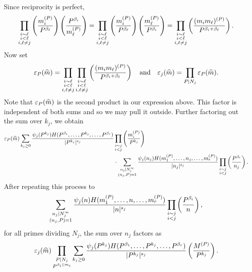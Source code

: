 \documentclass[12pt,reqno,oneside]{amsart}
\begin{document}
    Since reciprocity is perfect,
    \[
        \prod_{\substack{i \sim \ell \\ i < \ell \\ i,\ell \neq j}}\left(\frac{m_{i}^{(P)}}{P^{\beta_{\ell}}}\right)\left(\frac{P^{\beta_{i}}}{m_{\ell}^{(P)}}\right) = \prod_{\substack{i \sim \ell \\ i < \ell \\ i,\ell \neq j}}\left(\frac{m_{i}^{(P)}}{P^{\beta_{\ell}}}\right)\left(\frac{m_{\ell}^{(P)}}{P^{\beta_{i}}}\right) = \prod_{\substack{i \sim \ell \\ i < \ell \\ i,\ell \neq j}}\left(\frac{(m_{i}m_{\ell})^{(P)}}{P^{\beta_{i}+\beta_{\ell}}}\right).
    \]
    Now set
    \[
        \varepsilon_{P}(\widehat{m}) = \prod_{\substack{i \sim \ell \\ i < \ell \\ i,\ell \neq j}}\prod_{\substack{i \sim \ell \\ i < \ell \\ i,\ell \neq j}}\left(\frac{(m_{i}m_{\ell})^{(P)}}{P^{\beta_{i}+\beta_{\ell}}}\right) \quad \text{and} \quad \varepsilon_{j}(\widehat{m}) = \prod_{P \mid N_{j}}\varepsilon_{P}(\widehat{m}).
    \]
    Note that $\varepsilon_{P}(\widehat{m})$ is the second product in our expression above. This factor is independent of both sums and so we may pull it outside. Further factoring out the sum over $k_{j}$, we obtain
    \begin{align*}
        \varepsilon_{P}(\widehat{m})\sum_{k_{j} \ge 0}\frac{\psi_{j}(P^{k_{j}})H(P^{\beta_{1}},\ldots,P^{k_{j}},\ldots,P^{\beta_{r}})}{|P^{k_{j}}|^{s_{j}}}&\prod_{\substack{i \sim j \\ i < j}}\left(\frac{m_{i}^{(P)}}{P^{k_{j}}}\right) \\
        &\cdot \sum_{\substack{n_{j} \mid N_{j}^{\infty} \\ (n_{j},P) = 1}}\frac{\psi_{j}(n_{j})H(m_{1}^{(P)},\ldots,n_{j},\ldots,m_{r}^{(P)})}{|n_{j}|^{s_{j}}}\prod_{\substack{i \sim j \\ i < j}}\left(\frac{P^{\beta_{i}}}{n_{j}}\right).
    \end{align*}
    After repeating this process to
    \[
        \sum_{\substack{n_{j} \mid N_{j}^{\infty} \\ (n_{j},P) = 1}}\frac{\psi_{j}(n)H(m_{1}^{(P)},\ldots,n,\ldots,m_{r}^{(P)})}{|n|^{s_{j}}}\prod_{\substack{i \sim j \\ i < j}}\left(\frac{P^{\beta_{i}}}{n}\right),
    \]
    for all primes dividing $N_{j}$, the sum over $n_{j}$ factors as
    \[
        \varepsilon_{j}(\widehat{m})\prod_{\substack{P \mid N_{j} \\ P^{\beta_{i} \mid\mid m_{i}}}}\sum_{k_{j} \ge 0}\frac{\psi_{j}(P^{k_{j}})H(P^{\beta_{1}},\ldots,P^{k_{j}},\ldots,P^{\beta_{r}})}{|P^{k_{j}}|^{s_{j}}}\left(\frac{M^{(P)}}{P^{k_{j}}}\right).
    \]
\end{document}
